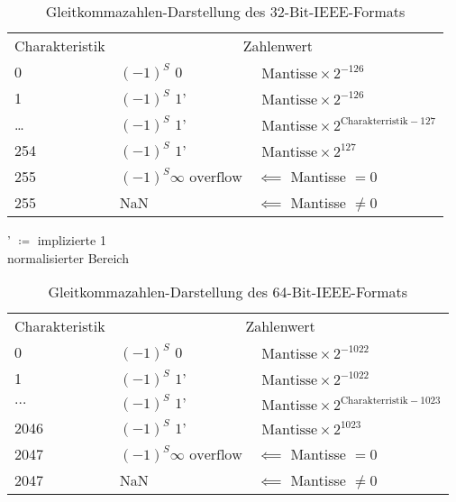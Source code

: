 \documentclass[a4paper]{scrartcl}
\begin{document}
	\begin{table}[H]
		\centering
		\begin{tabular}{|l|l|l|}
			\hline
			Charakteristik& \multicolumn{2}{c|}{Zahlenwert} \\ \hhline{===}
			0&\((-1)^S\text{ 0}\) & \( \text{ Mantisse} \times 2^{-126}\)  \\ 
			\rowcolor{green!50} 1& \((-1)^S \text{ 1'} \) & \( \text{ Mantisse} \times 2^{-126} \)\\ 
			\rowcolor{green!50} \dots & \((-1)^S \text{ 1'}\) &\( \text{ Mantisse} \times 2^{\text{Charakterristik}-127}\)\\
			\rowcolor{green!50} 254& \((-1)^S\text{ 1'}\) & \( \text{ Mantisse} \times 2^{127}\)\\ \hline
			255& \(   (-1)^S \infty \text{ overflow} \) & \(\impliedby\) Mantisse \(= 0\)\\
			255& NaN  & \(\impliedby\) Mantisse \(\neq 0\)\\
			\hline
		\end{tabular}
		\caption{Gleitkommazahlen-Darstellung des 32-Bit-IEEE-Formats}
	\end{table}
	 ' \( \coloneqq \) implizierte 1\\
	 \colorbox{green!50}{normalisierter Bereich} \\
	 
	 \begin{table}[H]
	 	\centering
	 	\begin{tabular}{|l|l|l|}
	 		\hline
	 		Charakteristik& \multicolumn{2}{c|}{Zahlenwert} \\ \hhline{===}
	 		0&\((-1)^S \text{ 0}\) & \( \text{ Mantisse} \times 2^{-1022}\) \\
	 		\rowcolor{green!50} 1& \((-1)^S \text{ 1'} \) & \( \text{ Mantisse} \times 2^{-1022} \)\\ 
	 		\rowcolor{green!50} \(\dots \)& \((-1)^S \text{ 1'}\) &\( \text{ Mantisse} \times 2^{\text{Charakterristik}-1023}\)\\ 
	 		\rowcolor{green!50} 2046& \((-1)^S \text{ 1'}\) & \( \text{ Mantisse} \times 2^{1023}\) \\ \hline
	 		2047&  \(   (-1)^S \infty \text{ overflow} \) & \(\impliedby\) Mantisse \(= 0\)\\
	 		2047& NaN  & \(\impliedby\) Mantisse \(\neq 0\)\\
	 		\hline
	 	\end{tabular}
	 	\caption{Gleitkommazahlen-Darstellung des 64-Bit-IEEE-Formats}
	 \end{table}
 	
\end{document}
